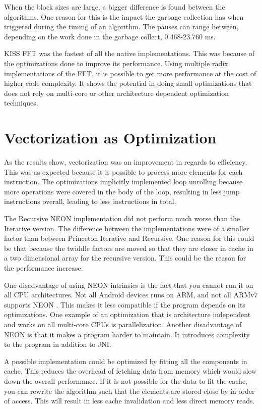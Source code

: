 When the block sizes are large, a bigger difference is found between the algorithms. One reason for this is the impact the garbage collection has when triggered during the timing of an algorithm. The pauses can range between, depending on the work done in the garbage collect, 0.468-23.760 ms.

KISS FFT was the fastest of all the native implementations. This was because of the optimizations done to improve its performance. Using multiple radix implementations of the FFT, it is possible to get more performance at the cost of higher code complexity. It shows the potential in doing small optimizations that does not rely on multi-core or other architecture dependent optimization techniques.

\section{Vectorization as Optimization}

As the results show, vectorization was an improvement in regards to efficiency. This was as expected because it is possible to process more elements for each instruction. The optimizations implicitly implemented loop unrolling because more operations were covered in the body of the loop, resulting in less jump instructions overall, leading to less instructions in total.

The Recursive NEON implementation did not perform much worse than the Iterative version. The difference between the implementations were of a smaller factor than between Princeton Iterative and Recursive. One reason for this could be that because the twiddle factors are moved so that they are closer in cache in a two dimensional array for the recursive version. This could be the reason for the performance increase.



One disadvantage of using NEON intrinsics is the fact that you cannot run it on all CPU architectures. Not all Android devices runs on ARM, and not all ARMv7 supports NEON \cite{arm:neon}. This makes it less compatible if the program depends on its optimizations. One example of an optimization that is architecture independent and works on all multi-core CPUs is parallelization. Another disadvantage of NEON is that it makes a program harder to maintain. It introduces complexity to the program in addition to JNI. 

A possible implementation could be optimized by fitting all the components in cache. This reduces the overhead of fetching data from memory which would slow down the overall performance. If it is not possible for the data to fit the cache, you can rewrite the algorithm such that the elements are stored close by in order of access. This will result in less cache invalidation and less direct memory reads.

